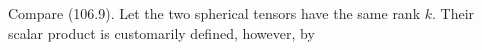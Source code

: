 Compare (106.9). Let the two spherical tensors have the same rank $k$. Their scalar product is customarily defined, however, by

